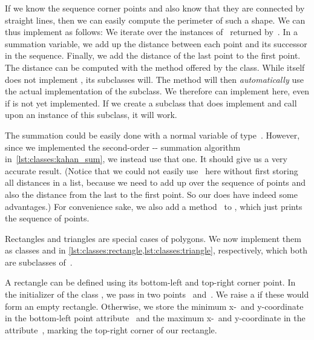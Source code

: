 If we know the sequence corner points and also know that they are connected by straight lines, then we can easily compute the perimeter of such a shape.
We can thus implement  as follows:
We iterate over the instances of~ returned by~.
In a summation variable, we add up the distance between each point and its successor in the sequence.
Finally, we add the distance of the last point to the first point.
The distance can be computed with the  method offered by the  class.
While  itself does not implement , its subclasses will.
The method  will then \emph{automatically} use the actual implementation of the subclass.
We therefore can implement  here, even if  is not yet implemented.
If we create a subclass that does implement  and call  upon an instance of this subclass, it will work.

The summation could be easily done with a normal variable of type~.
However, since we implemented the second-order \citeauthor{K1965PFRORTE}-\citeauthor{B1968NSIMA}-\citeauthor{N1974REVZSES} summation algorithm in~\cref{lst:classes:kahan_sum}, we instead use that one.
It should give us a very accurate result.
(Notice that we could not easily use~ here without first storing all distances in a list, because we need to add up over the sequence of points and also the distance from the last to the first point.
So our  does have indeed some advantages.)
For convenience sake, we also add a method~ to , which just prints the sequence of points.

Rectangles and triangles are special cases of polygons.
We now implement them as classes  and  in \cref{lst:classes:rectangle,lst:classes:triangle}, respectively, which both are subclasses of~.

A rectangle can be defined using its bottom-left and top-right corner point.
In the initializer  of the class , we pass in two points~ and~.
We raise a  if these would form an empty rectangle.
Otherwise, we store the minimum x\nobreakdashes-~and y\nobreakdashes-coordinate in the bottom-left point attribute~ and the maximum x\nobreakdashes-~and y\nobreakdashes-coordinate in the attribute~, marking the top-right corner of our rectangle.

